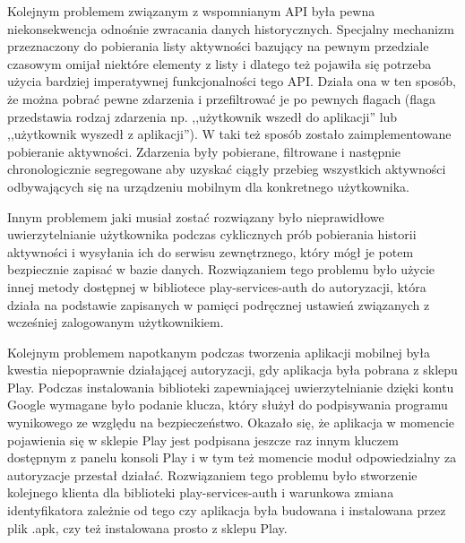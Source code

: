\documentclass[a4paper,twoside,12pt]{book}
\begin{document}
Kolejnym problemem związanym z wspomnianym API była pewna niekonsekwencja odnośnie zwracania danych historycznych. Specjalny mechanizm przeznaczony do pobierania listy aktywności bazujący na pewnym przedziale czasowym omijał niektóre elementy z listy i dlatego też pojawiła się potrzeba użycia bardziej imperatywnej funkcjonalności tego API. Działa ona w ten sposób, że można pobrać pewne zdarzenia i przefiltrować je po pewnych flagach (flaga przedstawia rodzaj zdarzenia np. ,,użytkownik wszedł do aplikacji'' lub ,,użytkownik wyszedł z aplikacji''). W taki też sposób zostało zaimplementowane pobieranie aktywności. Zdarzenia były pobierane, filtrowane i następnie chronologicznie segregowane aby uzyskać ciągły przebieg wszystkich aktywności odbywających się na urządzeniu mobilnym dla konkretnego użytkownika. 

Innym problemem jaki musiał zostać rozwiązany było nieprawidłowe uwierzytelnianie użytkownika podczas cyklicznych prób pobierania historii aktywności i wysyłania ich do serwisu zewnętrznego, który mógł je potem bezpiecznie zapisać w bazie danych. Rozwiązaniem tego problemu było użycie innej metody dostępnej w bibliotece play-services-auth do autoryzacji, która działa na podstawie zapisanych w pamięci podręcznej ustawień związanych z wcześniej zalogowanym użytkownikiem. 

Kolejnym problemem napotkanym podczas tworzenia aplikacji mobilnej była kwestia niepoprawnie działającej autoryzacji, gdy aplikacja była pobrana z sklepu Play. Podczas instalowania biblioteki zapewniającej uwierzytelnianie dzięki kontu Google wymagane było podanie klucza, który służył do podpisywania programu wynikowego ze względu na bezpieczeństwo. Okazało się, że aplikacja w momencie pojawienia się w sklepie Play jest podpisana jeszcze raz innym kluczem dostępnym z panelu konsoli Play i w tym też momencie moduł odpowiedzialny za autoryzacje przestał działać. Rozwiązaniem tego problemu było stworzenie kolejnego klienta dla biblioteki play-services-auth i warunkowa zmiana identyfikatora zależnie od tego czy aplikacja była budowana i instalowana przez plik .apk, czy też instalowana prosto z sklepu Play. 
\end{document}
